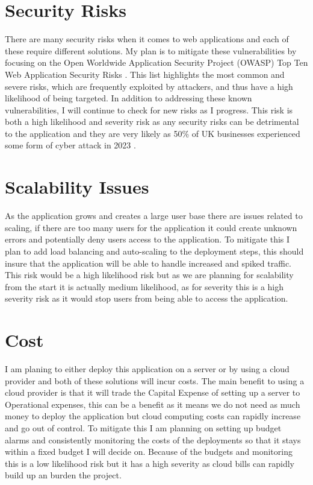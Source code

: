 \documentclass[]{project_report}
\begin{document}
\section{Security Risks}

There are many security risks when it comes to web applications and each of these require different solutions. My plan is to mitigate these vulnerabilities by focusing on the Open Worldwide Application Security Project (OWASP) Top Ten Web Application Security Risks \cite{owasp_2021}. This list highlights the most common and severe risks, which are frequently exploited by attackers, and thus have a high likelihood of being targeted. In addition to addressing these known vulnerabilities, I will continue to check for new risks as I progress. This risk is both a high likelihood and severity risk as any security risks can be detrimental to the application and they are very likely as 50\% of UK businesses experienced some form of cyber attack in 2023 \cite{griffiths_2023}.


\section{Scalability Issues}

As the application grows and creates a large user base there are issues related to scaling, if there are too many users for the application it could create unknown errors and potentially deny users access to the application. To mitigate this I plan to add load balancing and auto-scaling to the deployment steps, this should insure that the application will be able to handle increased and spiked traffic. This risk would be a high likelihood risk but as we are planning for scalability from the start it is actually medium likelihood, as for severity this is a high severity risk as it would stop users from being able to access the application.

\section{Cost}

I am planing to either deploy this application on a server or by using a cloud provider and both of these solutions will incur costs. The main benefit to using a cloud provider is that it will trade the Capital Expense of setting up a server to Operational expenses, this can be a benefit as it means we do not need as much money to deploy the application but cloud computing costs can rapidly increase and go out of control. To mitigate this I am planning on setting up budget alarms and consistently monitoring the costs of the deployments so that it stays within a fixed budget I will decide on. Because of the budgets and monitoring this is a low likelihood risk but it has a high severity as cloud bills can rapidly build up an burden the project.
\end{document}
